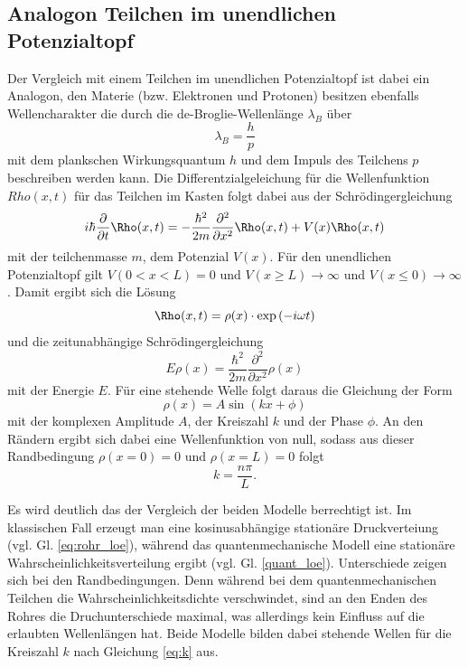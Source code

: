 \subsection{Analogon Teilchen im unendlichen Potenzialtopf}
Der Vergleich mit einem Teilchen im unendlichen Potenzialtopf ist dabei ein Analogon, 
den Materie (bzw. Elektronen und Protonen) besitzen ebenfalls Wellencharakter die durch die de-Broglie-Wellenlänge $\lambda_B$ über
\begin{equation}
    \lambda_B=\frac{h}{p}
\end{equation}
mit dem plankschen Wirkungsquantum $h$ und dem Impuls des Teilchens $p$ beschreiben werden kann.
Die Differentzialgeleichung für die Wellenfunktion $Rho(x,t)$ für das Teilchen im Kasten folgt dabei aus der Schrödingergleichung
\begin{equation}
    i\hbar \frac{\partial}{\partial t}\Rho(x,t)=-\frac{\hbar^2}{2m}\frac{\partial^2}{\partial x^2}\Rho(x,t)+V(x)\Rho(x,t)
\end{equation}
mit der teilchenmasse $m$, dem Potenzial $V(x)$. Für den unendlichen Potenzialtopf gilt $V(0 < x < L)=0$ und
$V(x \geq L)\rightarrow \infty$ und $V(x \leq 0)\rightarrow \infty$.
Damit ergibt sich die Lösung
\begin{equation}
    \Rho(x,t)=\rho(x)\cdot \exp{(-i\omega t)}
\end{equation}
und die zeitunabhängige Schrödingergleichung
\begin{equation}
    E\rho(x)=\frac{\hbar^2}{2m}\frac{\partial^2}{\partial x^2}\rho(x)
\end{equation}
mit der Energie $E$.
Für eine stehende Welle folgt daraus die Gleichung der Form
\begin{equation}
    \rho(x)=A\sin{(kx+\phi)}
    \label{eq:quant_loe}
\end{equation}
mit der komplexen Amplitude $A$, der Kreiszahl $k$ und der Phase $\phi$.
An den Rändern ergibt sich dabei eine Wellenfunktion von null, sodass aus dieser Randbedingung
$\rho(x=0)=0$ und $\rho(x=L)=0$ folgt
\begin{equation}
    k=\frac{n\pi}{L}.
    \label{eq:k}
\end{equation} 

Es wird deutlich das der Vergleich der beiden Modelle berrechtigt ist. Im klassischen Fall erzeugt man eine kosinusabhängige stationäre
Druckverteiung (vgl. Gl. \ref{eq:rohr_loe}), während das quantenmechanische Modell 
eine stationäre Wahrscheinlichkeitsverteilung ergibt (vgl. Gl. \ref{quant_loe}). Unterschiede zeigen sich bei den Randbedingungen.
Denn während bei dem quantenmechanischen Teilchen die Wahrscheinlichkeitsdichte verschwindet, sind an den Enden des Rohres 
die Druchunterschiede maximal, was allerdings kein Einfluss auf die erlaubten Wellenlängen hat.
Beide Modelle bilden dabei stehende Wellen für die Kreiszahl $k$ nach Gleichung \ref{eq:k} aus.

